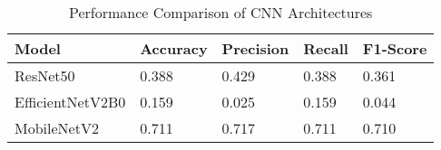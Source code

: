 \begin{table}[h]
\centering
\caption{Performance Comparison of CNN Architectures}
\label{tab:model_comparison}
\begin{tabular}{lllll}
\toprule
Model & Accuracy & Precision & Recall & F1-Score \\
\midrule
ResNet50 & 0.388 & 0.429 & 0.388 & 0.361 \\
EfficientNetV2B0 & 0.159 & 0.025 & 0.159 & 0.044 \\
MobileNetV2 & 0.711 & 0.717 & 0.711 & 0.710 \\
\bottomrule
\end{tabular}
\end{table}

